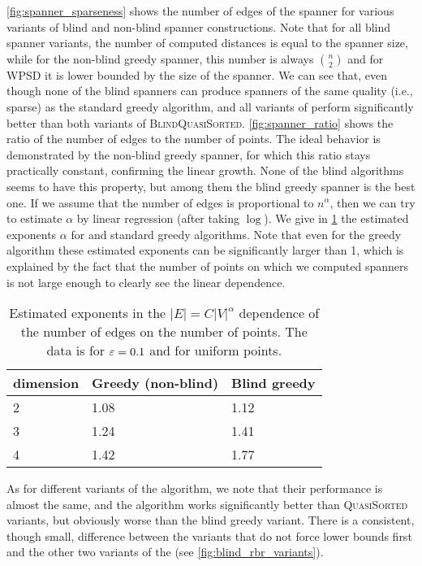 \documentclass[a4paper,UKenglish,cleveref, autoref]{lipics-v2019}
\begin{document}
\cref{fig:spanner_sparseness}
shows the number of edges of the spanner for various variants of 
blind and non-blind spanner constructions.
Note that for all blind spanner variants, the number of computed distances
is equal to the spanner size, while for the non-blind greedy spanner,
this number is always $\binom{n}{2}$ and for WPSD it is lower bounded
by the size of the spanner.
We can see that, even though none of the blind spanners can produce
spanners of the same quality (i.e., sparse) as the standard greedy algorithm,
\bgrdy and all variants of \brndm
perform significantly better than both variants of \textsc{BlindQuasiSorted}.
\cref{fig:spanner_ratio} shows the ratio of the number of edges to the number of points.
The ideal behavior is demonstrated by the non-blind greedy spanner,
for which this ratio stays practically constant, confirming the linear growth.
None of the blind algorithms seems to have this property, but among them
the blind greedy spanner is the best one. If we assume that the number of edges
is proportional to $n^\alpha$, then we can try to estimate $\alpha$ by 
linear regression (after taking $\log$).  We give in \cref{tbl:regr_coeff_spanner}
the estimated exponents $\alpha$ for \bgrdy and standard
greedy algorithms. Note that even for the greedy algorithm these estimated
exponents can be significantly larger than 1,
which is explained by the fact that the number of points
on which we computed spanners is not large enough to clearly see
the linear dependence.


\begin{table}[]
\begin{tabular}{|l|l|l|}
\hline
dimension & \textbf{Greedy (non-blind)} & \textbf{Blind greedy} \\ \hline
2         &         1.08                &  1.12                 \\ \hline
3         &         1.24                &  1.41                \\ \hline
4         &         1.42                &  1.77                 \\ \hline
\end{tabular}
\caption{Estimated exponents in the $|E|= C |V|^\alpha$ dependence of the number of edges
on the number of points. The data is for $\varepsilon = 0.1$ and for uniform points.}
\label{tbl:regr_coeff_spanner}
\end{table}


As for different variants of the \brndm algorithm,
we note that their performance is almost the same, and the algorithm works
significantly better than \textsc{QuasiSorted} variants, but obviously
worse than the blind greedy variant. There is a consistent, though small,
difference between the variants that do not force lower bounds first and
the other two variants of the \brndm (see \cref{fig:blind_rbr_variants}).
\end{document}
